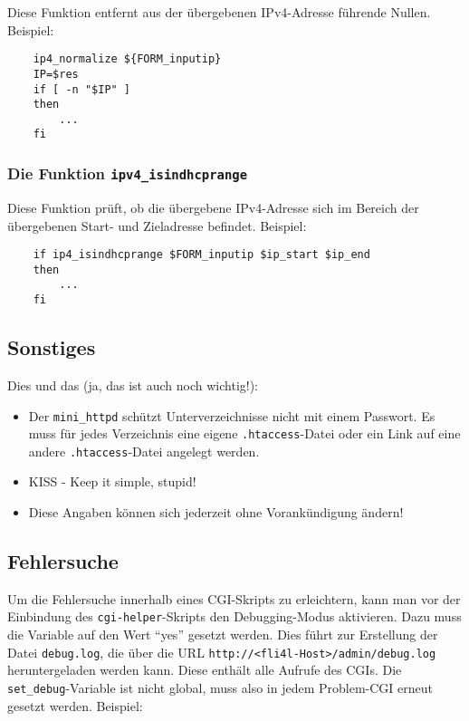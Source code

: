 Diese Funktion entfernt aus der übergebenen IPv4-Adresse führende Nullen.
Beispiel:

\begin{example}
\begin{verbatim}
    ip4_normalize ${FORM_inputip}
    IP=$res
    if [ -n "$IP" ]
    then
        ...
    fi
\end{verbatim}
\end{example}

\subsubsection{Die Funktion \texttt{ipv4\_isindhcprange}}

Diese Funktion prüft, ob die übergebene IPv4-Adresse sich im Bereich der
übergebenen Start- und Zieladresse befindet. Beispiel:
 
\begin{example}
\begin{verbatim}
    if ip4_isindhcprange $FORM_inputip $ip_start $ip_end
    then
        ...
    fi
\end{verbatim}
\end{example}

\subsection{Sonstiges}

Dies und das (ja, das ist auch noch wichtig!):

\begin{itemize}
 \item Der \texttt{mini\_httpd} schützt Unterverzeichnisse nicht mit einem
    Passwort. Es muss für jedes Verzeichnis eine eigene \texttt{.htaccess}-Datei
    oder ein Link auf eine andere \texttt{.htaccess}-Datei angelegt werden.
 \item KISS - Keep it simple, stupid!
 \item Diese Angaben können sich jederzeit ohne Vorankündigung ändern!
\end{itemize}

\subsection{Fehlersuche}

Um die Fehlersuche innerhalb eines CGI-Skripts zu erleichtern, kann man vor
der Einbindung des \texttt{cgi-helper}-Skripts den Debugging-Modus aktivieren.
Dazu muss die Variable  auf den Wert "`yes"' gesetzt werden.
Dies führt zur Erstellung der Datei \texttt{debug.log}, die über die URL
\texttt{http://<fli4l-Host>/admin/debug.log} heruntergeladen werden kann.
Diese enthält alle Aufrufe des CGIs. Die \texttt{set\_debug}-Variable ist nicht
global, muss also in jedem Problem-CGI erneut gesetzt werden. Beispiel:

